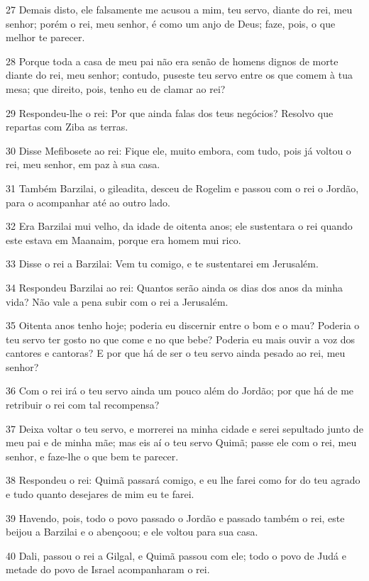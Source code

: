 \par 27 Demais disto, ele falsamente me acusou a mim, teu servo, diante do rei, meu senhor; porém o rei, meu senhor, é como um anjo de Deus; faze, pois, o que melhor te parecer.
\par 28 Porque toda a casa de meu pai não era senão de homens dignos de morte diante do rei, meu senhor; contudo, puseste teu servo entre os que comem à tua mesa; que direito, pois, tenho eu de clamar ao rei?
\par 29 Respondeu-lhe o rei: Por que ainda falas dos teus negócios? Resolvo que repartas com Ziba as terras.
\par 30 Disse Mefibosete ao rei: Fique ele, muito embora, com tudo, pois já voltou o rei, meu senhor, em paz à sua casa.
\par 31 Também Barzilai, o gileadita, desceu de Rogelim e passou com o rei o Jordão, para o acompanhar até ao outro lado.
\par 32 Era Barzilai mui velho, da idade de oitenta anos; ele sustentara o rei quando este estava em Maanaim, porque era homem mui rico.
\par 33 Disse o rei a Barzilai: Vem tu comigo, e te sustentarei em Jerusalém.
\par 34 Respondeu Barzilai ao rei: Quantos serão ainda os dias dos anos da minha vida? Não vale a pena subir com o rei a Jerusalém.
\par 35 Oitenta anos tenho hoje; poderia eu discernir entre o bom e o mau? Poderia o teu servo ter gosto no que come e no que bebe? Poderia eu mais ouvir a voz dos cantores e cantoras? E por que há de ser o teu servo ainda pesado ao rei, meu senhor?
\par 36 Com o rei irá o teu servo ainda um pouco além do Jordão; por que há de me retribuir o rei com tal recompensa?
\par 37 Deixa voltar o teu servo, e morrerei na minha cidade e serei sepultado junto de meu pai e de minha mãe; mas eis aí o teu servo Quimã; passe ele com o rei, meu senhor, e faze-lhe o que bem te parecer.
\par 38 Respondeu o rei: Quimã passará comigo, e eu lhe farei como for do teu agrado e tudo quanto desejares de mim eu te farei.
\par 39 Havendo, pois, todo o povo passado o Jordão e passado também o rei, este beijou a Barzilai e o abençoou; e ele voltou para sua casa.
\par 40 Dali, passou o rei a Gilgal, e Quimã passou com ele; todo o povo de Judá e metade do povo de Israel acompanharam o rei.

